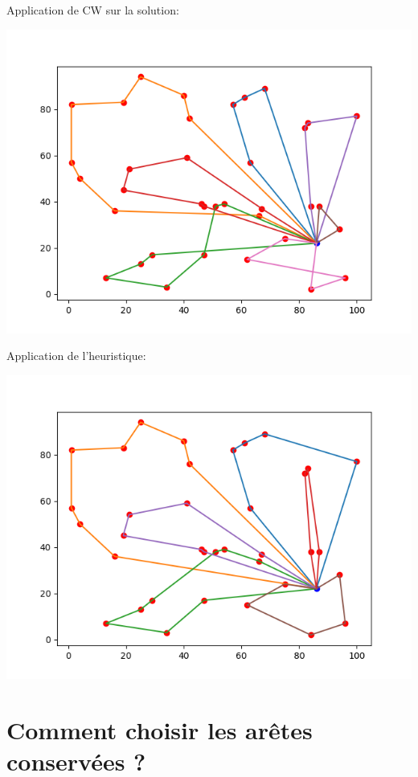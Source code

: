 \documentclass{beamer}
\begin{document}
\begin{frame}
Application de CW sur la solution:
\begin{center}
\includegraphics[scale=0.25]{new_solution.png}
\end{center}

Application de l'heuristique:
\begin{center}
\includegraphics[scale=0.25]{best_solution.png}
\end{center}
\end{frame}

\section{Comment choisir les arêtes conservées ?}
\end{document}
